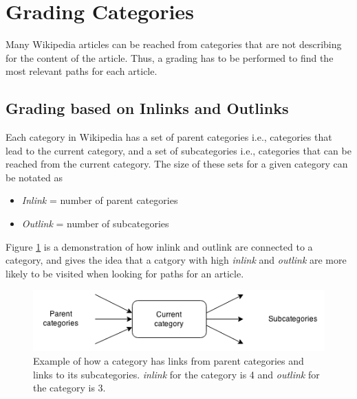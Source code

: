 \section{Grading Categories}

Many Wikipedia articles can be reached from categories that are not describing for the content of the article. Thus, a grading has to be performed to find the most relevant paths for each article. 

\subsection{Grading based on Inlinks and Outlinks}
Each category in Wikipedia has a set of parent categories i.e., categories that lead to the current category, and a set of subcategories i.e., categories that can be reached from the current category. The size of these sets for a given category can be notated as 
\begin{itemize}
\item \emph{Inlink} = number of parent categories
\item \emph{Outlink} = number of subcategories
\end{itemize}
Figure \ref{fig:Categorywparentandsub2} is a demonstration of how  inlink and outlink are connected to a category, and gives the idea that a catgory with high \emph{inlink} and \emph{outlink} are more likely to be visited when looking for paths for an article. 

\begin{figure}[h]
\centering
\includegraphics[width=\textwidth]{Chapters/Implementation/Grading/category_parent_sub}
\caption[Example of \emph{inlink} and \emph{outlink} for a category]{Example of how a category has links from parent categories and links to its subcategories. \emph{inlink} for the category is 4 and \emph{outlink} for the category is 3.}
\label{fig:Categorywparentandsub2}
\end{figure}

